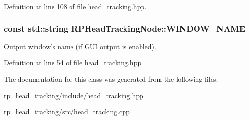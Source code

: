 \-Definition at line 108 of file head\-\_\-tracking.\-hpp.

\hypertarget{class_r_p_head_tracking_node_a55c8d0690666fd8ed95b0b8352cca591}{
\subsubsection[{\-W\-I\-N\-D\-O\-W\-\_\-\-N\-A\-M\-E}]{\setlength{\rightskip}{0pt plus 5cm}const std\-::string {\bf \-R\-P\-Head\-Tracking\-Node\-::\-W\-I\-N\-D\-O\-W\-\_\-\-N\-A\-M\-E}}}\label{class_r_p_head_tracking_node_a55c8d0690666fd8ed95b0b8352cca591}
\-Output window's name (if \-G\-U\-I output is enabled). 

\-Definition at line 54 of file head\-\_\-tracking.\-hpp.



\-The documentation for this class was generated from the following files\-:\begin{DoxyCompactItemize}
\item 
rp\-\_\-head\-\_\-tracking/include/head\-\_\-tracking.\-hpp\item 
rp\-\_\-head\-\_\-tracking/src/head\-\_\-tracking.\-cpp\end{DoxyCompactItemize}
